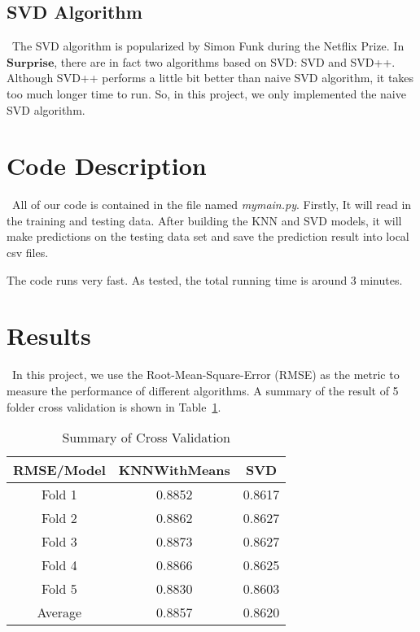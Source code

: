\documentclass[12pt]{article}
\begin{document}
\subsection{SVD Algorithm}
\quad\ The SVD algorithm is popularized by Simon Funk during the Netflix Prize. In $ \textbf{Surprise} $, there are in fact two algorithms based on SVD: SVD and SVD++. Although SVD++ performs a little bit better than naive SVD algorithm, it takes too much longer time to run. So, in this project, we only implemented the naive SVD algorithm.

\section{Code Description}
\quad\ All of our code is contained in the file named \textit{mymain.py}. Firstly, It will read in the training and testing data. After building the KNN and SVD models, it will make predictions on the testing data set and save the prediction result into local csv files.

The code runs very fast. As tested, the total running time is around 3 minutes.

\section{Results}
\quad\ In this project, we use the Root-Mean-Square-Error (RMSE) as the metric to measure the performance of different algorithms. A summary of the result of 5 folder cross validation is shown in Table~\ref{result}.


\begin{table}[htb]
 \caption{Summary of Cross Validation} \label{result}
 \vspace{0.1in}
\begin{center}
  \begin{tabular}{  c  c  c}
    \hline
    RMSE/Model            & KNNWithMeans        & SVD     \\ \hline
    Fold 1                    & 0.8852                    & 0.8617 \\ \hline
    Fold 2                    & 0.8862                    & 0.8627 \\ \hline
    Fold 3                    & 0.8873                    &0.8627 \\ \hline
    Fold 4                    & 0.8866                    & 0.8625 \\ \hline
    Fold 5                    & 0.8830                    & 0.8603 \\ \hline
    Average                 & 0.8857                    &  0.8620 \\ \hline      
  \end{tabular}
\end{center}
\end{table}
\end{document}
